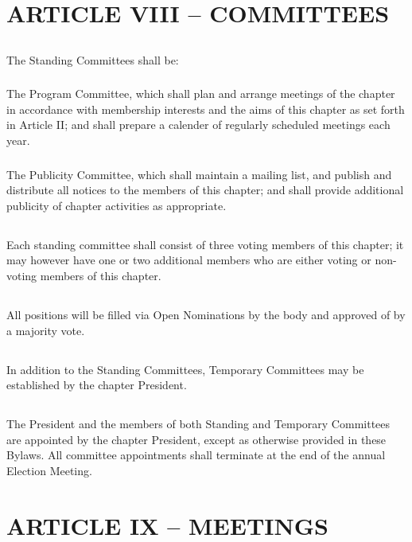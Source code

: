 \documentclass[12pt]{article}
\begin{document}
\section{ARTICLE VIII – COMMITTEES}
\subsection{}	The Standing Committees shall be:
\subsubsection{}	The Program Committee, which shall plan and arrange meetings of the chapter in accordance with membership interests and the aims of this chapter as set forth in Article II; and shall prepare a calender of regularly scheduled meetings each year.
\subsubsection{}	The Publicity Committee, which shall maintain a mailing list, and publish and distribute all notices to the members of this chapter; and shall provide additional publicity of chapter activities as appropriate.
\subsection{}	Each standing committee shall consist of three voting members of this chapter; it may however have one or two additional members who are either voting or non-voting members of this chapter.
\subsection{}	All positions will be filled via Open Nominations by the body and approved of by a majority vote.
\subsection{}	In addition to the Standing Committees, Temporary Committees may be established by the chapter President.
\subsection{}	The President and the members of both Standing and Temporary Committees are appointed by the chapter President, except as otherwise provided in these Bylaws. All committee appointments shall terminate at the end of the annual Election Meeting.

\section{ARTICLE IX – MEETINGS}
\end{document}
